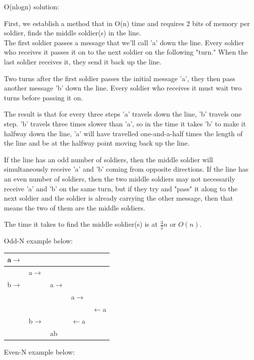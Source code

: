 \documentclass[11pt]{article}
\begin{document}
O(nlogn) solution:

First, we establish a method that in O(n) time and requires 2 bits of memory per soldier, finds the middle soldier(s) in the line.\\

The first soldier passes a message that we'll call 'a' down the line. Every soldier who receives it passes it on to the next soldier on the following "turn." When the last soldier receives it, they send it back up the line.

Two turns after the first soldier passes the initial message 'a', they then pass another message 'b' down the line. Every soldier who receives it must wait two turns before passing it on.

The result is that for every three steps 'a' travels down the line, 'b' travels one step. 'b' travels three times slower than 'a', so in the time it takes 'b' to make it halfway down the line, 'a' will have travelled one-and-a-half times the length of the line and be at the halfway point moving back up the line.

If the line has an odd number of soldiers, then the middle soldier will simultaneously receive 'a' and 'b' coming from opposite directions. If the line has an even number of soldiers, then the two middle soldiers may not necessarily receive 'a' and 'b' on the same turn, but if they try and "pass" it along to the next soldier and the soldier is already carrying the other message, then that means the two of them are the middle soldiers.

The time it takes to find the middle soldier(s) is at $\frac{3}{2}n$ or $O(n)$.

Odd-N example below:\\

\begin{tabular}{|l|l|l|l|l|}
    \hline
        a$\rightarrow$&&&&\\
    \hline
        &a$\rightarrow$&&&\\
    \hline
        b$\rightarrow$&&a$\rightarrow$&&\\
    \hline
        &&&a$\rightarrow$&\\
    \hline
        &&&&$\leftarrow$a\\
    \hline
        &b$\rightarrow$&&$\leftarrow$a&\\
    \hline
        &&ab&&\\
    \hline
\end{tabular}

Even-N example below:\\
\end{document}

